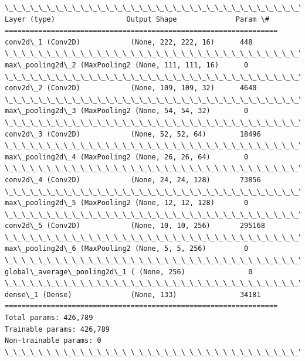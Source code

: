 \documentclass[11pt]{article}
\begin{document}
    \begin{Verbatim}[commandchars=\\\{\}]
\_\_\_\_\_\_\_\_\_\_\_\_\_\_\_\_\_\_\_\_\_\_\_\_\_\_\_\_\_\_\_\_\_\_\_\_\_\_\_\_\_\_\_\_\_\_\_\_\_\_\_\_\_\_\_\_\_\_\_\_\_\_\_\_\_
Layer (type)                 Output Shape              Param \#   
=================================================================
conv2d\_1 (Conv2D)            (None, 222, 222, 16)      448       
\_\_\_\_\_\_\_\_\_\_\_\_\_\_\_\_\_\_\_\_\_\_\_\_\_\_\_\_\_\_\_\_\_\_\_\_\_\_\_\_\_\_\_\_\_\_\_\_\_\_\_\_\_\_\_\_\_\_\_\_\_\_\_\_\_
max\_pooling2d\_2 (MaxPooling2 (None, 111, 111, 16)      0         
\_\_\_\_\_\_\_\_\_\_\_\_\_\_\_\_\_\_\_\_\_\_\_\_\_\_\_\_\_\_\_\_\_\_\_\_\_\_\_\_\_\_\_\_\_\_\_\_\_\_\_\_\_\_\_\_\_\_\_\_\_\_\_\_\_
conv2d\_2 (Conv2D)            (None, 109, 109, 32)      4640      
\_\_\_\_\_\_\_\_\_\_\_\_\_\_\_\_\_\_\_\_\_\_\_\_\_\_\_\_\_\_\_\_\_\_\_\_\_\_\_\_\_\_\_\_\_\_\_\_\_\_\_\_\_\_\_\_\_\_\_\_\_\_\_\_\_
max\_pooling2d\_3 (MaxPooling2 (None, 54, 54, 32)        0         
\_\_\_\_\_\_\_\_\_\_\_\_\_\_\_\_\_\_\_\_\_\_\_\_\_\_\_\_\_\_\_\_\_\_\_\_\_\_\_\_\_\_\_\_\_\_\_\_\_\_\_\_\_\_\_\_\_\_\_\_\_\_\_\_\_
conv2d\_3 (Conv2D)            (None, 52, 52, 64)        18496     
\_\_\_\_\_\_\_\_\_\_\_\_\_\_\_\_\_\_\_\_\_\_\_\_\_\_\_\_\_\_\_\_\_\_\_\_\_\_\_\_\_\_\_\_\_\_\_\_\_\_\_\_\_\_\_\_\_\_\_\_\_\_\_\_\_
max\_pooling2d\_4 (MaxPooling2 (None, 26, 26, 64)        0         
\_\_\_\_\_\_\_\_\_\_\_\_\_\_\_\_\_\_\_\_\_\_\_\_\_\_\_\_\_\_\_\_\_\_\_\_\_\_\_\_\_\_\_\_\_\_\_\_\_\_\_\_\_\_\_\_\_\_\_\_\_\_\_\_\_
conv2d\_4 (Conv2D)            (None, 24, 24, 128)       73856     
\_\_\_\_\_\_\_\_\_\_\_\_\_\_\_\_\_\_\_\_\_\_\_\_\_\_\_\_\_\_\_\_\_\_\_\_\_\_\_\_\_\_\_\_\_\_\_\_\_\_\_\_\_\_\_\_\_\_\_\_\_\_\_\_\_
max\_pooling2d\_5 (MaxPooling2 (None, 12, 12, 128)       0         
\_\_\_\_\_\_\_\_\_\_\_\_\_\_\_\_\_\_\_\_\_\_\_\_\_\_\_\_\_\_\_\_\_\_\_\_\_\_\_\_\_\_\_\_\_\_\_\_\_\_\_\_\_\_\_\_\_\_\_\_\_\_\_\_\_
conv2d\_5 (Conv2D)            (None, 10, 10, 256)       295168    
\_\_\_\_\_\_\_\_\_\_\_\_\_\_\_\_\_\_\_\_\_\_\_\_\_\_\_\_\_\_\_\_\_\_\_\_\_\_\_\_\_\_\_\_\_\_\_\_\_\_\_\_\_\_\_\_\_\_\_\_\_\_\_\_\_
max\_pooling2d\_6 (MaxPooling2 (None, 5, 5, 256)         0         
\_\_\_\_\_\_\_\_\_\_\_\_\_\_\_\_\_\_\_\_\_\_\_\_\_\_\_\_\_\_\_\_\_\_\_\_\_\_\_\_\_\_\_\_\_\_\_\_\_\_\_\_\_\_\_\_\_\_\_\_\_\_\_\_\_
global\_average\_pooling2d\_1 ( (None, 256)               0         
\_\_\_\_\_\_\_\_\_\_\_\_\_\_\_\_\_\_\_\_\_\_\_\_\_\_\_\_\_\_\_\_\_\_\_\_\_\_\_\_\_\_\_\_\_\_\_\_\_\_\_\_\_\_\_\_\_\_\_\_\_\_\_\_\_
dense\_1 (Dense)              (None, 133)               34181     
=================================================================
Total params: 426,789
Trainable params: 426,789
Non-trainable params: 0
\_\_\_\_\_\_\_\_\_\_\_\_\_\_\_\_\_\_\_\_\_\_\_\_\_\_\_\_\_\_\_\_\_\_\_\_\_\_\_\_\_\_\_\_\_\_\_\_\_\_\_\_\_\_\_\_\_\_\_\_\_\_\_\_\_

    \end{Verbatim}
\end{document}
